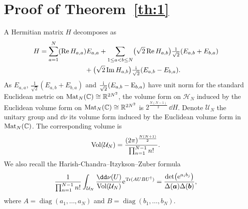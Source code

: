 \section{Proof of Theorem~\ref{th:1}}
\label{S2}
A Hermitian matrix $H$ decomposes as
\begin{gather*}
H = \sum_{a = 1}^N (\operatorname{Re} H_{a,a}) E_{a,a}+ \sum_{1 \leq a < b \leq N} \bigl(\sqrt{2} \operatorname{Re} H_{a,b}\bigr) \tfrac{1}{\sqrt{2}}(E_{a,b} + E_{b,a}) \\
\hphantom{H =}{}
 + \bigl(\sqrt{2} \operatorname{Im} H_{a,b}\bigr) \tfrac{{\rm i}}{\sqrt{2}}(E_{a,b} - E_{b,a}).
\end{gather*}
As $E_{a,a}$, $\frac{1}{\sqrt{2}}(E_{a,b} + E_{b,a})$ and $\frac{{\rm i}}{\sqrt{2}}(E_{a,b} - {\rm E}_{b,a})$ have unit norm for the standard Euclidean metric on ${\rm Mat}_{N}(\mathbb{C}) \cong \mathbb{R}^{2N^2}$, the volume form on $\mathcal{H}_N$ induced by the Euclidean volume form on ${\rm Mat}_N(\mathbb{C}) \cong \mathbb{R}^{2N^2}$ is $2^{\frac{N(N - 1)}{2}}\,\dd H$. Denote $\mathcal{U}_N$ the unitary group and $\dd\nu$ its volume form induced by the Euclidean volume form in ${\rm Mat}_N(\mathbb{C})$. The corresponding volume is
 \[
 {\rm Vol}(\mathcal{U}_N) = \frac{(2\pi)^{\frac{N(N + 1)}{2}}}{\prod_{n = 1}^{N - 1} n!}.
\]
We also recall the Harish-Chandra--Itzykson--Zuber formula \cite{Itzykson:1979fi}
\[
\frac{1}{\prod_{n = 1}^{N - 1} n!} \int_{\mathcal{U}_N} \frac{\dd \nu(U)}{{\rm Vol}(\mathcal{U}_N)} {\rm e}^{{\rm Tr}(AUBU^{\dagger})} = \frac{\det\bigl({\rm e}^{a_ib_j}\bigr)}{\Delta(\boldsymbol{a})\Delta(\boldsymbol{b})},
\]
 where $A = \operatorname{diag}(a_1,\dots,a_N)$ and $B = \operatorname{diag}(b_1,\dots,b_N)$.


